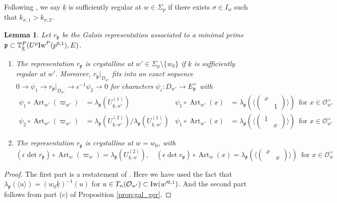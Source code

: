 \documentclass[leqno]{amsart}
\newtheorem{lem}[thm]{Lemma}
\theoremstyle{definition}
\theoremstyle{remark}
\newcommand{\oo}{\mathcal{O}}
\DeclareMathOperator{\Art}{Art}
\newcommand{\fp}{\mathfrak{p}}
\newcommand{\wt}[1]{\underline{ #1 }}
\newcommand{\Iw}{\textnormal{Iw}} %
\newcommand{\TT}{\mathbb{T}} %
\begin{document}
Following \cite{ger},
we say $\wt{k}$ is sufficiently regular
at $w\in \Sigma_p$
if there exists  $\sigma\in I_{w}$
such that  $k_{\sigma,1}>k_{\sigma,2}$.
\begin{lem}\label{lem:galois_at_p}
	Let $r_{\fp}$ be the Galois representation
	associated to a minimal prime
	$\fp\subset \TT^P_{\wt{k}}(U^p\Iw^P(p^{0,1}),E)$.
	\begin{enumerate}[label=(\alph*)]
	\item The representation $r_\fp$ is crystalline at
    $w'\in \Sigma_p\setminus\{ w_0\}$
	if $\wt{k}$ is sufficiently regular at $w'$.
	Moreover, $r_\fp\vert_{D_{w'}}$ 
	fits into an exact sequence
	$0\to \psi_1\to r_{\fp}\vert_{D_{w'}} \to \epsilon^{-1}\psi_2\to 0$
	for characters $\psi_i\colon D_{w'}\to E_{\fp}^{\times}$ with
	\begin{equation}\label{eq:Gal_hecke_at_p'}
	\begin{aligned}
		\psi_1\circ \Art_{w'}(\varpi_{w'})&=
		\lambda_{\fp}(U_{\wt{k},w'}^{(1)}) &
		\psi_1\circ \Art_{w'}(x)&=
		\lambda_{\fp}
		(\langle 
		(\begin{smallmatrix}
			x&\\&1
		\end{smallmatrix})
		\rangle)\, \text{ for }x\in \oo_{w'}^{\times}\\
		\psi_2\circ \Art_{w'}(\varpi_{w'})&=
		\lambda_{\fp}(U_{\wt{k},w'}^{(2)})/
		\lambda_{\fp}(U_{\wt{k},w'}^{(1)}) &
		\psi_1\circ \Art_{w'}(x)&=
		\lambda_{\fp}
		(\langle 
		(\begin{smallmatrix}
			1&\\&x
		\end{smallmatrix})
		\rangle)\, \text{ for }x\in \oo_{w'}^{\times}
	\end{aligned}
	\end{equation}
	\item The representation $r_\fp$ is 
	crystalline at $w=w_0$, with 
	\begin{equation}\label{eq:Gal_hecke_at_p}
	(\epsilon\det r_\fp)\circ \Art_w(\varpi_w)=
	\lambda_{\fp}(U_{\wt{k},w}^{(2)}),\quad
	(\epsilon\det r_\fp)\circ \Art_w(x)=
	\lambda_{\fp}
	(\langle 
	(\begin{smallmatrix}
		x&\\&x
	\end{smallmatrix})
	\rangle)\, \text{ for }x\in \oo_{w}^{\times}
	\end{equation}
	\end{enumerate}
\end{lem}
\begin{proof}
The first part is a restatement of \cite[Cor 2.33]{ger}.
Here we have used the fact that
$\lambda_\fp(\langle u\rangle)=(w_0\wt{k})^{-1}(u)$ 
for $u\in T_n(\oo_{w'})\subset \Iw(w'^{0,1})$. 
And the second part follows from part (c)
of Proposition \ref{prop:gal_ger}.
\end{proof}
\end{document}
